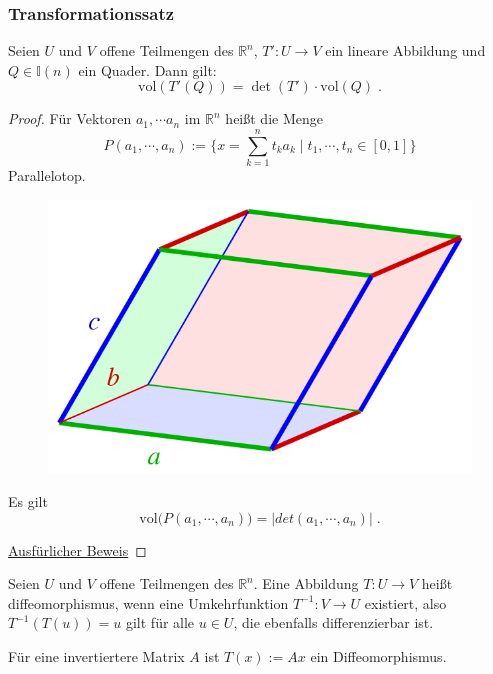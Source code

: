 \subsubsection{Transformationssatz}




\begin{Satz}
Seien $U$ und $V$ offene Teilmengen des $\mathbb{R}^n$, $T': U \to V$ ein lineare Abbildung und  $Q \in \mathbb{I}(n)$ ein Quader.
Dann gilt:
 $$ \text{vol}  (T'(Q))   =  \det (T') \cdot   \text{vol}(Q) \; .$$
\end{Satz}
\begin{proof}
Für Vektoren $a_1, \cdots a_n$ im $\mathbb{R}^n$ heißt die Menge 
$$ P(a_1, \cdots,  a_n) := \biggl \{  x = \sum_{k=1}^n t_k a_k  \; | \; t_1, \cdots , t_n \in [0,1]  \biggr \}$$
Parallelotop.
\begin{figure}[H]
      \centering
    \includegraphics[width=0.6 \textwidth]{images/640px-Parallelepiped-0}    
\end{figure}
Es gilt  $$  \text{vol} \bigr( P(a_1, \cdots, a_n) \bigr) =  | det (a_1, \cdots, a_n) |   \; .$$

\href{https://www.math.uchicago.edu/~may/VIGRE/VIGRE2007/REUPapers/FINALAPP/Peng.pdf}{Ausfürlicher Beweis}

\end{proof}


\begin{Definition}[Diffeomorphismus]
Seien $U$ und $V$ offene Teilmengen des $\mathbb{R}^n$. Eine Abbildung  $T: U \to V$ heißt diffeomorphismus, wenn eine  Umkehrfunktion $T^{-1}: V  \to U$ existiert, also $T^{-1} (T (u)) = u$ gilt für alle $u \in U$, die ebenfalls differenzierbar ist.
\end{Definition}

\begin{Beispiel}
Für eine invertiertere Matrix $A$ ist $T(x):= Ax$ ein Diffeomorphismus.
\end{Beispiel}

